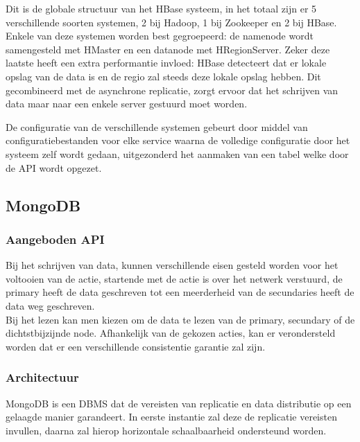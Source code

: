 Dit is de globale structuur van het HBase systeem, in het totaal zijn er 5 verschillende soorten systemen, 2 bij Hadoop, 1 bij Zookeeper en 2 bij HBase. Enkele van deze systemen worden best gegroepeerd: de namenode wordt samengesteld met HMaster en een datanode met HRegionServer. Zeker deze laatste heeft een extra performantie invloed: HBase detecteert dat er lokale opslag van de data is en de regio zal steeds deze lokale opslag hebben. Dit gecombineerd met de asynchrone replicatie, zorgt ervoor dat het schrijven van data maar naar een enkele server gestuurd moet worden. 

De configuratie van de verschillende systemen gebeurt door middel van configuratiebestanden voor elke service waarna de volledige configuratie door het systeem zelf wordt gedaan, uitgezonderd het aanmaken van een tabel welke door de API wordt opgezet. 

\subsection{MongoDB}

\subsubsection{Aangeboden API} \todo{}
Bij het schrijven van data, kunnen verschillende eisen gesteld worden voor het voltooien van de actie, startende met de actie is over het netwerk verstuurd, de primary heeft de data geschreven tot een meerderheid van de secundaries heeft de data weg geschreven. \\Bij het lezen kan men kiezen om de data te lezen van de primary, secundary of de dichtstbijzijnde node. Afhankelijk van de gekozen acties, kan er verondersteld worden dat er een verschillende consistentie garantie zal zijn.

\subsubsection{Architectuur}
MongoDB is een \gls{DBMS} dat de vereisten van replicatie en data distributie op een gelaagde manier garandeert. In eerste instantie zal deze de replicatie vereisten invullen, daarna zal hierop horizontale schaalbaarheid ondersteund worden. 

